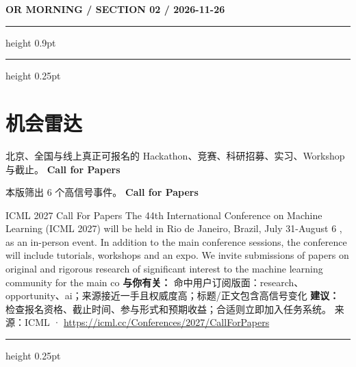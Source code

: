 \documentclass[10.5pt]{ctexart}
\begin{document}
\newpage
{\small\bfseries OR MORNING / SECTION 02 / 2026-11-26}
\vspace{2mm}
\hrule height 0.9pt
\vspace{1.5mm}
\hrule height 0.25pt
\vspace{4mm}
\section*{机会雷达}
{\color{ormuted} 北京、全国与线上真正可报名的 Hackathon、竞赛、科研招募、实习、Workshop 与截止。}
\vspace{2mm}
{\LARGE\bfseries Call for Papers}\par
\vspace{1mm}
{\color{ormuted} 本版筛出 6 个高信号事件。}
\vspace{3mm}
{\Large\bfseries Call for Papers}\par
ICML 2027 Call For Papers The 44th International Conference on Machine Learning (ICML 2027) will be held in Rio de Janeiro, Brazil, July 31-August 6 , as an in-person event. In addition to the main conference sessions, the conference will include tutorials, workshops and an expo. We invite submissions of papers on original and rigorous research of significant interest to the machine learning community for the main co
\textbf{与你有关：} 命中用户订阅版面：research、opportunity、ai；来源接近一手且权威度高；标题/正文包含高信号变化
\textbf{建议：} 检查报名资格、截止时间、参与形式和预期收益；合适则立即加入任务系统。
{\footnotesize\color{ormuted} 来源：ICML · \url{https://icml.cc/Conferences/2027/CallForPapers}}
\vspace{4mm}
\hrule height 0.25pt
\vspace{3mm}
\end{document}
